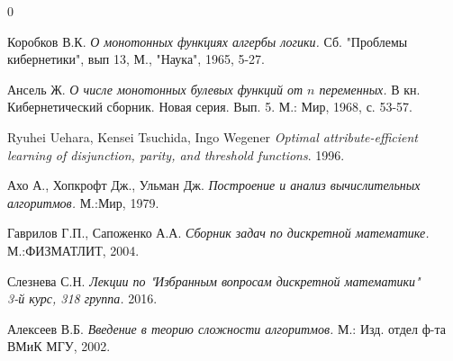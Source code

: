 \documentclass[oneside, final, 14pt]{extreport}
\begin{document}
	\begin{thebibliography} {0}
		
		 Коробков В.К. \emph{О монотонных функциях алгербы логики.} Сб. "Проблемы кибернетики", вып 13, М., "Наука", 1965, 5-27.
		
		 Ансель Ж. \emph{О числе монотонных булевых функций от $n$ переменных.} В кн. Кибернетический сборник. Новая серия. Вып. 5. 
		М.: Мир, 1968, с. 53-57.
		
		 Ryuhei Uehara, Kensei Tsuchida, Ingo Wegener \emph{Optimal attribute-efficient learning of disjunction, parity, and threshold functions}. 1996.
		
		 Ахо А., Хопкрофт Дж., Ульман Дж. \emph{Построение и анализ вычислительных алгоритмов.} М.:Мир, 1979.
		
		 Гаврилов Г.П., Сапоженко А.А. \emph{Сборник задач по дискретной математике.} М.:ФИЗМАТЛИТ, 2004.
		
		 Слезнева С.Н. \emph{Лекции по "Избранным вопросам дискретной математики" \\3-й курс, 318 группа.} 2016.
		
		 Алексеев В.Б. \emph{Введение в теорию сложности алгоритмов.} М.: Изд. отдел ф-та ВМиК МГУ, 2002.
		
	\end{thebibliography}
\end{document}
